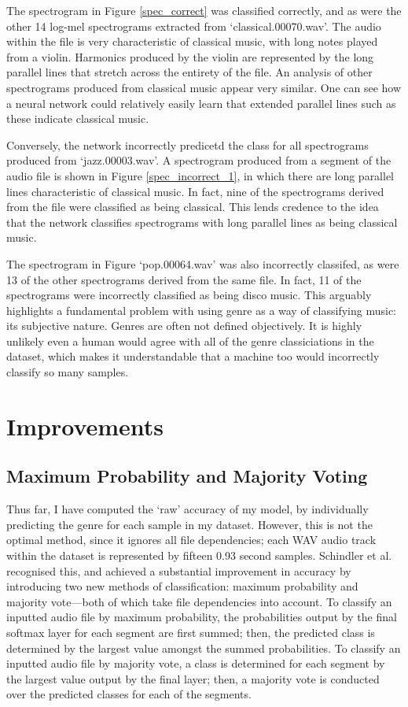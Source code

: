 \documentclass[conference]{IEEEtran}
\begin{document}
The spectrogram in Figure \ref{spec_correct} was classified correctly, and as were the other 14 log-mel spectrograms extracted from `classical.00070.wav'.
The audio within the file is very characteristic of classical music, with long notes played from a violin.
Harmonics produced by the violin are represented by the long parallel lines that stretch across the entirety of the file.
An analysis of other spectrograms produced from classical music appear very similar.
One can see how a neural network could relatively easily learn that extended parallel lines such as these indicate classical music.

Conversely, the network incorrectly predicetd the class for all spectrograms produced from `jazz.00003.wav'.
A spectrogram produced from a segment of the audio file is shown in Figure \ref{spec_incorrect_1}, in which there are long parallel lines characteristic of classical music.
In fact, nine of the spectrograms derived from the file were classified as being classical.
This lends credence to the idea that the network classifies spectrograms with long parallel lines as being classical music.

The spectrogram in Figure `pop.00064.wav' was also incorrectly classifed, as were 13 of the other spectrograms derived from the same file.
In fact, 11 of the spectrograms were incorrectly classified as being disco music.
This arguably highlights a fundamental problem with using genre as a way of classifying music: its subjective nature.
Genres are often not defined objectively.
It is highly unlikely even a human would agree with all of the genre classiciations in the dataset, which makes it understandable that a machine too would incorrectly classify so many samples.

\section{Improvements}

\subsection{Maximum Probability and Majority Voting}

Thus far, I have computed the `raw' accuracy of my model, by individually predicting the genre for each sample in my dataset.
However, this is not the optimal method, since it ignores all file dependencies; each WAV audio track within the dataset is represented by fifteen 0.93 second samples.
Schindler et al. recognised this, and achieved a substantial improvement in accuracy by introducing two new methods of classification: maximum probability and majority vote---both of which take file dependencies into account.
To classify an inputted audio file by maximum probability, the probabilities output by the final softmax layer for each segment are first summed; then, the predicted class is determined by the largest value amongst the summed probabilities.
To classify an inputted audio file by majority vote, a class is determined for each segment by the largest value output by the final layer; then, a majority vote is conducted over the predicted classes for each of the segments.
\end{document}
